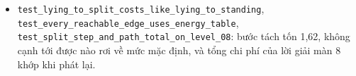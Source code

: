\begin{itemize}
\item
  \texttt{test\_\allowbreak{}lying\_\allowbreak{}to\_\allowbreak{}split\_\allowbreak{}costs\_\allowbreak{}like\_\allowbreak{}lying\_\allowbreak{}to\_\allowbreak{}standing}, \texttt{test\_\allowbreak{}every\_\allowbreak{}reachable\_\allowbreak{}edge\_\allowbreak{}uses\_\allowbreak{}energy\_\allowbreak{}table}, \texttt{test\_\allowbreak{}split\_\allowbreak{}step\_\allowbreak{}and\_\allowbreak{}path\_\allowbreak{}total\_\allowbreak{}on\_\allowbreak{}level\_\allowbreak{}08}: bước tách tốn 1,62, không cạnh tới được nào rơi về mức mặc định, và tổng chi phí của lời giải màn 8 khớp khi phát lại.
\end{itemize}
